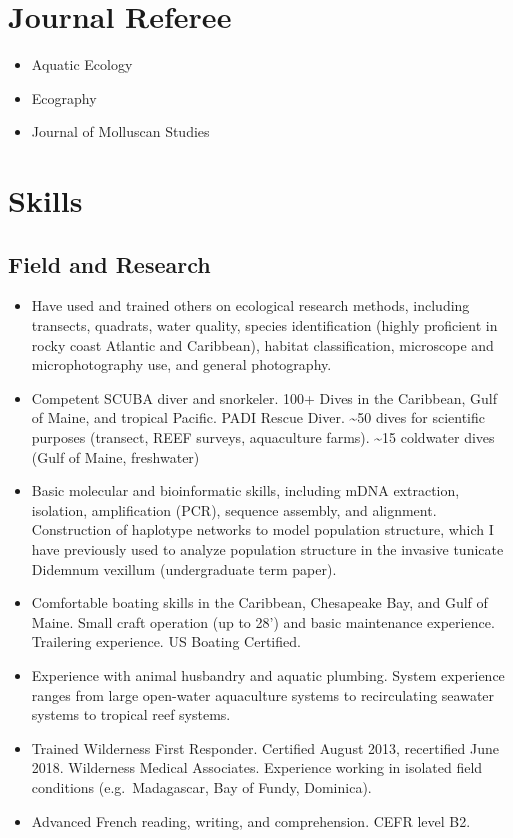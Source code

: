 \documentclass[11pt,a4paper,]{awesome-cv}
\providecommand{\tightlist}{%
	\setlength{\itemsep}{0pt}\setlength{\parskip}{0pt}}
\begin{document}
\hypertarget{journal-referee}{%
\section{Journal Referee}\label{journal-referee}}

\begin{itemize}
\tightlist
\item
  Aquatic Ecology
\item
  Ecography
\item
  Journal of Molluscan Studies
\end{itemize}

\hypertarget{skills}{%
\section{Skills}\label{skills}}

\hypertarget{field-and-research}{%
\subsection{Field and Research}\label{field-and-research}}

\begin{itemize}
\tightlist
\item
  Have used and trained others on ecological research methods, including
  transects, quadrats, water quality, species identification (highly
  proficient in rocky coast Atlantic and Caribbean), habitat
  classification, microscope and microphotography use, and general
  photography.
\item
  Competent SCUBA diver and snorkeler. 100+ Dives in the Caribbean, Gulf
  of Maine, and tropical Pacific. PADI Rescue Diver. \textasciitilde50
  dives for scientific purposes (transect, REEF surveys, aquaculture
  farms). \textasciitilde15 coldwater dives (Gulf of Maine, freshwater)
\item
  Basic molecular and bioinformatic skills, including mDNA extraction,
  isolation, amplification (PCR), sequence assembly, and alignment.
  Construction of haplotype networks to model population structure,
  which I have previously used to analyze population structure in the
  invasive tunicate Didemnum vexillum (undergraduate term paper).
\item
  Comfortable boating skills in the Caribbean, Chesapeake Bay, and Gulf
  of Maine. Small craft operation (up to 28') and basic maintenance
  experience. Trailering experience. US Boating Certified.
\item
  Experience with animal husbandry and aquatic plumbing. System
  experience ranges from large open-water aquaculture systems to
  recirculating seawater systems to tropical reef systems.
\item
  Trained Wilderness First Responder. Certified August 2013, recertified
  June 2018. Wilderness Medical Associates. Experience working in
  isolated field conditions (e.g.~Madagascar, Bay of Fundy, Dominica).
\item
  Advanced French reading, writing, and comprehension. CEFR level B2.
\end{itemize}
\end{document}
